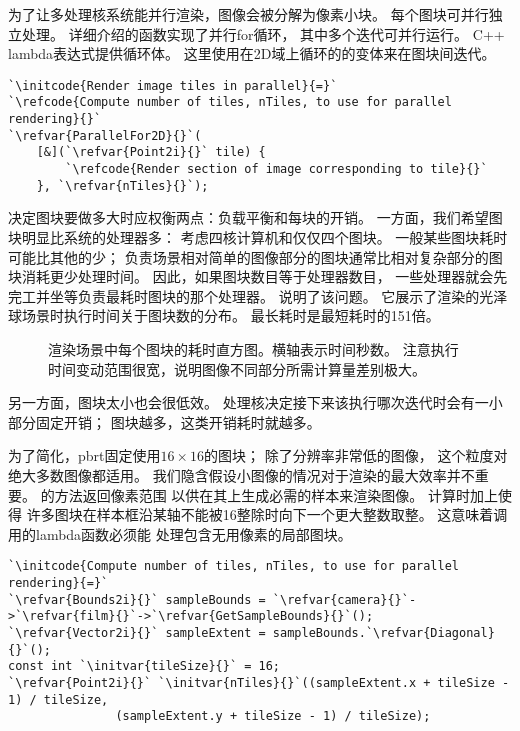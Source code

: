 为了让多处理核系统能并行渲染，图像会被分解为像素小块。
每个图块可并行独立处理。
详细介绍的函数实现了并行{\ttfamily for}循环，
其中多个迭代可并行运行。
C++ lambda表达式提供循环体。
这里使用在2D域上循环的的变体来在图块间迭代。
\begin{lstlisting}
`\initcode{Render image tiles in parallel}{=}`
`\refcode{Compute number of tiles, nTiles, to use for parallel rendering}{}`
`\refvar{ParallelFor2D}{}`(
    [&](`\refvar{Point2i}{}` tile) {
        `\refcode{Render section of image corresponding to tile}{}`
    }, `\refvar{nTiles}{}`);
\end{lstlisting}

决定图块要做多大时应权衡两点：负载平衡和每块的开销。
一方面，我们希望图块明显比系统的处理器多：
考虑四核计算机和仅仅四个图块。
一般某些图块耗时可能比其他的少；
负责场景相对简单的图像部分的图块通常比相对复杂部分的图块消耗更少处理时间。
因此，如果图块数目等于处理器数目，
一些处理器就会先完工并坐等负责最耗时图块的那个处理器。
说明了该问题。
它展示了渲染的光泽球场景时执行时间关于图块数的分布。
最长耗时是最短耗时的151倍。
\begin{figure}[htbp]
    \centering
    \caption{渲染\protect{}场景中每个图块的耗时直方图。横轴表示时间秒数。
        注意执行时间变动范围很宽，说明图像不同部分所需计算量差别极大。}
    \label{fig:1.18}
\end{figure}

另一方面，图块太小也会很低效。
处理核决定接下来该执行哪次迭代时会有一小部分固定开销；
图块越多，这类开销耗时就越多。

为了简化，pbrt固定使用$16\times16$的图块；
除了分辨率非常低的图像，
这个粒度对绝大多数图像都适用。
我们隐含假设小图像的情况对于渲染的最大效率并不重要。
的方法返回像素范围
以供在其上生成必需的样本来渲染图像。
计算时加上使得
许多图块在样本框沿某轴不能被16整除时向下一个更大整数取整。
这意味着调用的lambda函数必须能
处理包含无用像素的局部图块。
\begin{lstlisting}
`\initcode{Compute number of tiles, nTiles, to use for parallel rendering}{=}`
`\refvar{Bounds2i}{}` sampleBounds = `\refvar{camera}{}`->`\refvar{film}{}`->`\refvar{GetSampleBounds}{}`();
`\refvar{Vector2i}{}` sampleExtent = sampleBounds.`\refvar{Diagonal}{}`();
const int `\initvar{tileSize}{}` = 16;
`\refvar{Point2i}{}` `\initvar{nTiles}{}`((sampleExtent.x + tileSize - 1) / tileSize,
               (sampleExtent.y + tileSize - 1) / tileSize);
\end{lstlisting}

